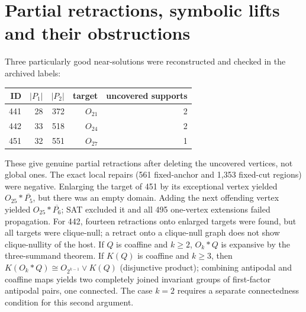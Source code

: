 \documentclass[11pt,a4paper]{article}
\theoremstyle{definition}\newtheorem{definition}[theorem]{Definition}\newtheorem{example}[theorem]{Example}
\theoremstyle{remark}\newtheorem{remark}[theorem]{Remark}
\newcommand{\cprod}{\mathbin{\lor}}
\begin{document}
\section{Partial retractions, symbolic lifts and their obstructions}\label{sec:lift}
Three particularly good near-solutions were reconstructed and checked in the archived labels:
\begin{center}\begin{tabular}{rrrrr}\toprule
ID & \(|P_1|\)&\(|P_2|\)& target & uncovered supports\\\midrule
441&28&372&\(O_{21}\)&2\\
442&33&518&\(O_{24}\)&2\\
451&32&551&\(O_{27}\)&1\\\bottomrule\end{tabular}\end{center}
These give genuine partial retractions after deleting the uncovered vertices, not global ones. The exact local repairs (561 fixed-anchor and 1,353 fixed-cut regions) were negative. Enlarging the target of 451 by its exceptional vertex yielded \(O_{25}*\overline{P_5}\), but there was an empty domain. Adding the next offending vertex yielded \(O_{25}*\overline{P_6}\); SAT excluded it and all 495 one-vertex extensions failed propagation. For 442, fourteen retractions onto enlarged targets were found, but all targets were clique-null; a retract onto a clique-null graph does not show clique-nullity of the host. If \(Q\) is coaffine and \(k\ge2\), \(O_k*Q\) is expansive by the three-summand theorem. If \(K(Q)\) is coaffine and \(k\ge3\), then \(K(O_k*Q)\cong O_{2^{k-1}}\cprod K(Q)\) (disjunctive product); combining antipodal and coaffine maps yields two completely joined invariant groups of first-factor antipodal pairs, one connected. The case \(k=2\) requires a separate connectedness condition for this second argument.
\end{document}
